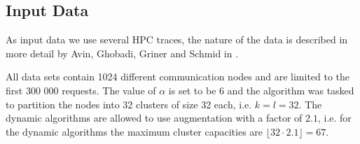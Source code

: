 \documentclass[a4paper,xcolor=dvipsnames, tikz, 12pt]{article}
\theoremstyle{definition}
\begin{document}

\subsection{Input Data}
\label{inputDesc}

As input data we use several HPC traces, the nature of the data is described in more detail by Avin, Ghobadi, Griner and Schmid in \cite{Avin2019}.

All data sets contain 1024 different communication nodes and are limited to the first 300 000 requests. The value of $\alpha$ is set to be 6 and the algorithm was tasked to partition the nodes into 32 clusters of size 32 each, i.e. $k=l=32$. The dynamic algorithms are allowed to use augmentation with a factor of $2.1$, i.e. for the dynamic algorithms the maximum cluster capacities are $\lfloor32\cdot2.1\rfloor=67$.

\begin{comment}

\begin{figure}
	\begin{tikzpicture}
	\begin{axis}[
	ybar,
	bar width=1.4cm,
	enlarge x limits=0.25,
	width=\textwidth,
	height=.5\textwidth,
	legend style={at={(0.5,-0.25)},
		anchor=north,legend columns=-1},
	symbolic x coords={A,B,C,D},
	xtick=data,
	xlabel={input set},
	nodes near coords,
	nodes near coords align={vertical},
	ymin=0,ymax=370000,
	ylabel={cost},
	]
	\addplot table[x=database,y=decomposition]{\totalcostplot};
	\addplot table[x=database,y=ParMetis]{\totalcostplot};
	\addplot table[x=database, y=Static]{\totalcostplot};
	\legend{Decomposition, ParMetis, Static}
	\end{axis}
	\end{tikzpicture}
	\caption{comparison of total cost}\label{totalCostPlot}
\end{figure}

\begin{figure}
	\begin{tikzpicture}
	\begin{axis}[
	ybar,
	bar width=1.4cm,
	enlarge x limits=0.25,
	width=\textwidth,
	height=.5\textwidth,
	legend style={at={(0.5,-0.25)},
		anchor=north,legend columns=-1},
	symbolic x coords={A,B,C,D},
	xtick=data,
	xlabel={input set},
	nodes near coords,
	nodes near coords align={vertical},
	ymin=0,ymax=750000,
	ylabel={time in ms},
	]
	\addplot table[x=database,y=decomposition]{\runtimeplot};
	\addplot table[x=database,y=ParMetis]{\runtimeplot};
	\addplot table[x=database, y=Static]{\runtimeplot};
	\legend{Decomposition, ParMetis, Static}
	\end{axis}
	\end{tikzpicture}
	\caption{comparison of run time}\label{runTimePlot}
\end{figure}

\end{comment}
\end{document}

